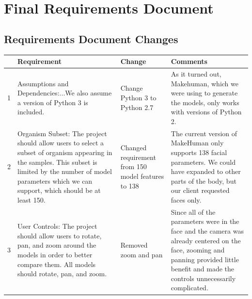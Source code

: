 \documentclass[letterpaper,10pt, onecolumn, draftclsnofoot]{IEEEtran}
\begin{document}
\section{Final Requirements Document}
\subsection{Requirements Document Changes}
\begin{center}
	\begin{tabularx}{\textwidth}{|c|X|X|X|}
		\hline
		& Requirement & Change & Comments \\
		\hline
		1 & Assumptions and Dependencies:...We also assume a version of Python 3 is included. & Change Python 3 to Python 2.7 & As it turned out, Makehuman, which we were using to generate the models, only works with versions of Python 2.\\
		\hline
		2 & Organism Subset: The project should allow users to select a subset of organism appearing in the samples. This subset is limited by the number of model parameters which we can support, which should be at least 150. & Changed requirement from 150 model features to 138 & The current version of MakeHuman only supports 138 facial parameters. We could have expanded to other parts of the body, but our client requested faces only.\\ 
		\hline
		3 &  User Controls: The project should allow users to rotate, pan, and zoom around the models in order to better compare them. All models should rotate, pan, and zoom. & Removed zoom and pan & Since all of the parameters were in the face and the camera was already centered on the face, zooming and panning provided little benefit and made the controls unnecessarily complicated.\\
		\hline
	\end{tabularx}
\end{center}
\end{document}
